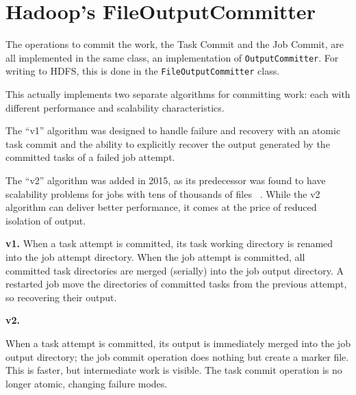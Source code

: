 \documentclass[conference]{IEEEtran}
\begin{document}
\section{Hadoop's FileOutputCommitter}
\label{sec:fileoutputcommitter}


The operations to commit the work, the Task Commit and the Job Commit,
are all implemented in the same class, an implementation of \texttt{OutputCommitter}.
For writing to HDFS, this is done in the \texttt{FileOutputCommitter} class.

This actually implements two separate algorithms for committing work: each
with different performance and scalability characteristics.

The ``v1'' algorithm was designed to handle failure and recovery with an
atomic task commit and the ability to explicitly recover the output generated
by the committed tasks of a failed job attempt.

The ``v2'' algorithm was added in 2015, as its predecessor was found
to have scalability problems for jobs with tens of thousands of files
\ \cite{MAPREDUCE-4815}.
While the v2 algorithm can deliver better performance, it comes at the price of
reduced isolation of output.

\textbf{v1.}
When a task attempt is committed, its task working directory is renamed into
the job attempt directory.
When the job attempt is committed, all committed task directories are merged
(serially) into the job output directory.
A restarted job move the directories of committed tasks from the previous
attempt, so recovering their output.


\textbf{v2.}

When a task attempt is committed, its output is immediately merged into the
job output directory;
the job commit operation does nothing but create a marker file.
This is faster, but intermediate work is visible.
The task commit operation is no longer atomic, changing failure modes.

\end{document}

